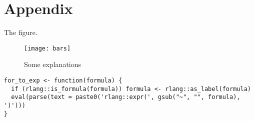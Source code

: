 

\appendix
\section{Appendix}

\renewcommand\thefigure{A.\arabic{figure}}
\setcounter{figure}{0}


The figure.

\begin{figure}[!htbp]
\centering
\texttt{[image: bars]}
\caption{ \break Some explanations}
\label{fig:apend1}
\end{figure} 


\begin{lstlisting}[caption={Title}]
for_to_exp <- function(formula) {
  if (rlang::is_formula(formula)) formula <- rlang::as_label(formula)
  eval(parse(text = paste0('rlang::expr(', gsub("~", "", formula), ')')))
}
\end{lstlisting}